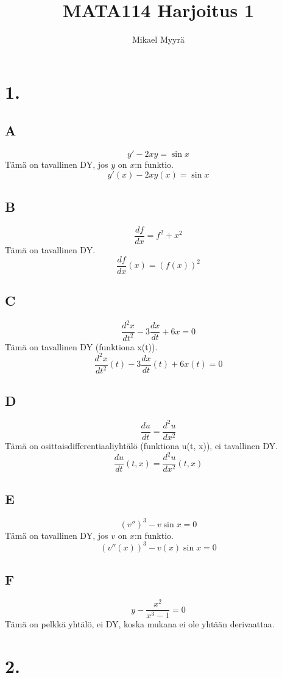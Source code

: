 \documentclass{article}
\title{MATA114 Harjoitus 1}
\author{Mikael Myyrä}
\date{}
\begin{document}
\maketitle

\section*{1.}

\subsection*{A}
\[
  y' - 2xy = \sin x
\]
Tämä on tavallinen DY, jos $y$ on $x$:n funktio.
\[
  y'(x) - 2xy(x) = \sin x
\]

\subsection*{B}
\[
  \frac{df}{dx} = f^2 + x^2
\]
Tämä on tavallinen DY.
\[
  \frac{df}{dx}(x) = (f(x))^2
\]

\subsection*{C}
\[
  \frac{d^2 x}{dt^2} - 3 \frac{dx}{dt} + 6x = 0
\]
Tämä on tavallinen DY (funktiona x(t)).
\[
  \frac{d^2 x}{dt^2}(t) - 3 \frac{dx}{dt}(t) + 6x(t) = 0
\]

\subsection*{D}
\[
  \frac{du}{dt} = \frac{d^2 u}{dx^2}
\]
Tämä on osittaisdifferentiaaliyhtälö (funktiona u(t, x)), ei tavallinen DY.
\[
  \frac{du}{dt}(t, x) = \frac{d^2 u}{dx^2}(t, x)
\]

\subsection*{E}
\[
  (v'')^3 - v \sin x = 0
\]
Tämä on tavallinen DY, jos $v$ on $x$:n funktio.
\[
  (v''(x))^3 - v(x) \sin x = 0
\]

\subsection*{F}
\[
  y - \frac{x^2}{x^3 - 1} = 0
\]
Tämä on pelkkä yhtälö, ei DY, koska mukana ei ole yhtään derivaattaa.

\section*{2.}
\end{document}

